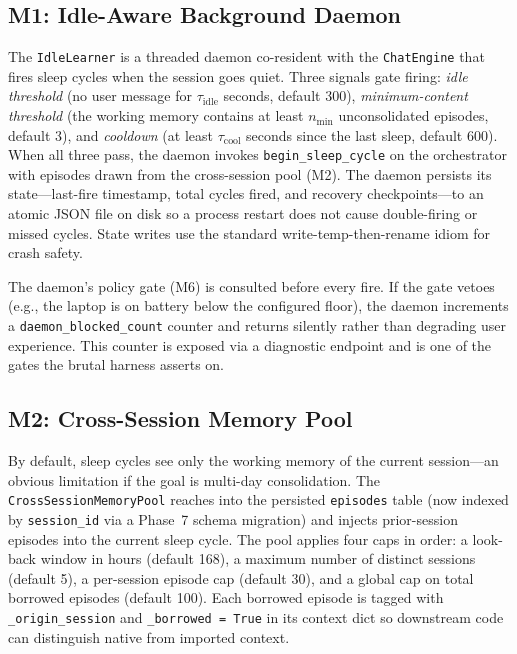\documentclass[11pt,twocolumn]{article}
\begin{document}
\subsection{M1: Idle-Aware Background Daemon}

The \texttt{IdleLearner} is a threaded daemon co-resident with the \texttt{ChatEngine} that fires sleep cycles when the session goes quiet. Three signals gate firing: \emph{idle threshold} (no user message for $\tau_{\text{idle}}$ seconds, default 300), \emph{minimum-content threshold} (the working memory contains at least $n_{\text{min}}$ unconsolidated episodes, default 3), and \emph{cooldown} (at least $\tau_{\text{cool}}$ seconds since the last sleep, default 600). When all three pass, the daemon invokes \texttt{begin\_sleep\_cycle} on the orchestrator with episodes drawn from the cross-session pool (M2). The daemon persists its state---last-fire timestamp, total cycles fired, and recovery checkpoints---to an atomic JSON file on disk so a process restart does not cause double-firing or missed cycles. State writes use the standard write-temp-then-rename idiom for crash safety.

The daemon's policy gate (M6) is consulted before every fire. If the gate vetoes (e.g., the laptop is on battery below the configured floor), the daemon increments a \texttt{daemon\_blocked\_count} counter and returns silently rather than degrading user experience. This counter is exposed via a diagnostic endpoint and is one of the gates the brutal harness asserts on.

\subsection{M2: Cross-Session Memory Pool}

By default, sleep cycles see only the working memory of the current session---an obvious limitation if the goal is multi-day consolidation. The \texttt{CrossSessionMemoryPool} reaches into the persisted \texttt{episodes} table (now indexed by \texttt{session\_id} via a Phase~7 schema migration) and injects prior-session episodes into the current sleep cycle. The pool applies four caps in order: a look-back window in hours (default 168), a maximum number of distinct sessions (default 5), a per-session episode cap (default 30), and a global cap on total borrowed episodes (default 100). Each borrowed episode is tagged with \texttt{\_origin\_session} and \texttt{\_borrowed = True} in its context dict so downstream code can distinguish native from imported context.
\end{document}
